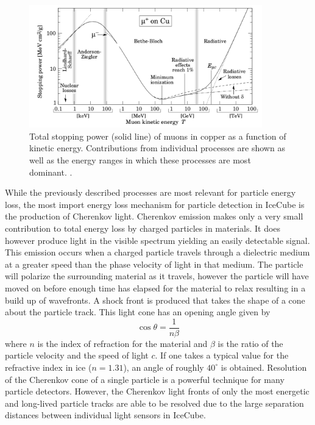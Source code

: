 \documentclass{gatech-thesis}
\begin{document}
\begin{figure}[ht]
  \begin{center}
    \includegraphics[width=0.9\textwidth,keepaspectratio]{MuonStoppingPower.png}
  \end{center}
  \caption{Total stopping power (solid line) of muons in copper as a function of kinetic energy. Contributions from individual processes are shown as well as the energy ranges in which these processes are most dominant. \cite{2001ADNDT..78..183G}.}
  \label{fig:MuonStoppingPower}
\end{figure}

While the previously described processes are most relevant for particle energy loss, the most import energy loss mechanism for particle detection in IceCube is the production of Cherenkov light. Cherenkov emission makes only a very small contribution to total energy loss by charged particles in materials. It does however produce light in the visible spectrum yielding an easily detectable signal. This emission occurs when a charged particle travels through a dielectric medium at a greater speed than the phase velocity of light in that medium. The particle will polarize the surrounding material as it travels, however the particle will have moved on before enough time has elapsed for the material to relax resulting in a build up of wavefronts. A shock front is produced that takes the shape of a cone about the particle track. This light cone has an opening angle given by
\begin{equation}
\cos{\theta}=\frac{1}{n\beta}
\end{equation}
where $n$ is the index of refraction for the material and $\beta$ is the ratio of the particle velocity and the speed of light $c$. If one takes a typical value for the refractive index in ice ($n=1.31$), an angle of roughly $40^{\circ}$ is obtained. Resolution of the Cherenkov cone of a single particle is a powerful technique for many particle detectors. However, the Cherenkov light fronts of only the most energetic and long-lived particle tracks are able to be resolved due to the large separation distances between individual light sensors in IceCube.
\end{document}
